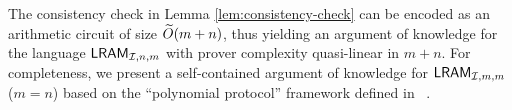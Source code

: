 The consistency check in Lemma \ref{lem:consistency-check} can be encoded as an arithmetic circuit of size $\widetilde{O}(m+n)$, thus
yielding an argument of knowledge for the language $\mathsf{LRAM}_{\mathcal{I},n,m}$ with prover complexity quasi-linear in
$m+n$. For completeness, we present a self-contained argument of knowledge for
$\mathsf{LRAM}_{\mathcal{I},m,m}$ ($m=n$) based on the ``polynomial protocol'' framework defined in ~\cite{Gabizon2019PLONKPO}.



\begin{comment}
\begin{enumerate}[leftmargin=2em]
\item $\prover\rightarrow\verifier$: For the transcript $\tr^\ast=(\vec{t^\ast},\vec{\op^\ast},\vec{A^\ast},\vec{V^\ast})$,
the prover computes encoding polynomials $\wt{\tr^\ast}=({t^\ast}(X),\op^\ast(X), A^\ast(X),V^\ast(X))$. Next, the prover
computes sets $I_1$ and $I_2$ as in Section \ref{subsec:encoded-relations}, and then computes polynomials
$Z_b(X)=\prod_{i\in I_b}(X-\omega^i)$ for $b=1,2$.
The prover also interpolates polynomials $\delta^\ast_A(X)$ and $\delta^\ast_T(X)$ satisfying
$\delta^\ast_A(\omega^i) = A^\ast_{i+1} - A^\ast_i$ for $i\in I_1$ and $\delta^\ast_T(\omega^i)=t^\ast_{i+1}-t^\ast_i$ for $i\not\in I_1$.
The prover sends all the above polynomials to the verifier.
\item $\verifier$ computes: The verifier checks relations (C1)-(C6) in Lemma \ref{lem:addr-ordered-transcript}. The range constraints
in (C7) can be verified using polynomial protocols in sub-vector lookup arguments such as Caulk+ ~\cite{EPRINT:PosKat22}, CQ
~\cite{EPRINT:EagFioGab22}.
\end{enumerate}


\subsection{Succinct Argument for Verifiable RAM}\label{subsec:succ-args}
Polynomial protocols can be compiled into succinct arguments of knowledge using an extractable polynomial commitment scheme. At a
high level the compilation involves the prover sending ``commitments'' to the message polynomials, whereas the verifier checks
the polynomial identities probabilistically by requesting evaluation proofs of the polynomials at random points.
We complile the polynomial protocol for RAM to a succinct argument of knowledge in the Algebraic Group Model (AGM)
 using $\kzg$ as the extractable polynomial commitment scheme. We also leverage homomorphism of $\kzg$ scheme
to avoid sending commitments and evaluations for polynomials which are linear combinations of previously committed polynomials.
We now present an argument for verifiable RAM, which combines the polynomial protocols in this section, and instantiates
them using $\kzg$ commitments. We make standard optimisations of batching several identity checks into one where applicable.
Let $\srs=\{\gone{\tau^i},\gtwo{\tau^i}\}_{i=0}^d$
denote the $\kzg$ setup parameters for degree $d\geq k$ for the bilinear group $\mathsf{BG}=(\Gone,\Gtwo,\gone{1},\gtwo{1},e)$. Let
$\F=\F_p$ be the finite field where $p$ is the order of the groups.



\end{comment}
